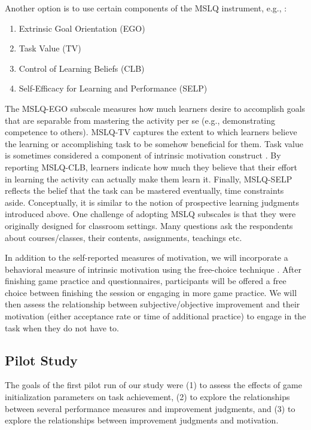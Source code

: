 Another option is to use certain components of the \acf{MSLQ} instrument, e.g., \parencite{duncan_motivated_2015}:
\begin{enumerate}
  \item Extrinsic Goal Orientation (EGO)
  \item Task Value (TV)
  \item Control of Learning Beliefs (CLB)
  \item Self-Efficacy for Learning and Performance (SELP)
\end{enumerate}
The \ac{MSLQ}-EGO subscale measures how much learners desire to accomplish goals that are separable from mastering the activity per se (e.g., demonstrating competence to others). \ac{MSLQ}-TV captures the extent to which learners believe the learning or accomplishing task to be somehow beneficial for them. Task value is sometimes considered a component of intrinsic motivation construct \cite{mcauley_psychometric_1989}. By reporting \ac{MSLQ}-CLB, learners indicate how much they believe that their effort in learning the activity can actually make them learn it. Finally, \ac{MSLQ}-SELP reflects the belief that the task can be mastered eventually, time constraints aside. Conceptually, it is similar to the notion of prospective learning judgments introduced above. One challenge of adopting \ac{MSLQ} subscales is that they were originally designed for classroom settings. Many questions ask the respondents about courses/classes, their contents, assignments, teachings etc. 

In addition to the self-reported measures of motivation, we will incorporate a behavioral measure of intrinsic motivation using the free-choice technique \parencite{ryan_self-determination_2000}. After finishing game practice and questionnaires, participants will be offered a free choice between finishing the session or engaging in more game practice. We will then assess the relationship between subjective/objective improvement and their motivation (either acceptance rate or time of additional practice) to engage in the task when they do not have to. 

\subsection{Pilot Study}\label{subsec:pilot}

The goals of the first pilot run of our study were (1) to assess the effects of game initialization parameters on task achievement, (2) to explore the relationships between several performance measures and improvement judgments, and (3) to explore the relationships between improvement judgments and motivation.

